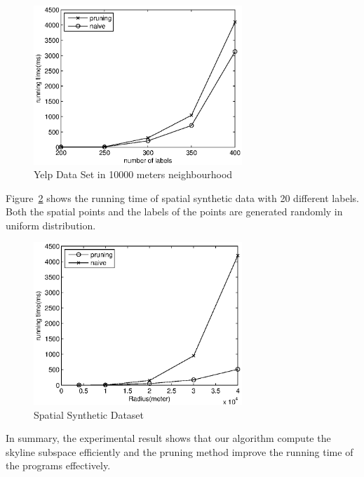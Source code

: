 \begin{figure}[h]
    \centering
      \includegraphics[width=0.7\textwidth]{figs/Yelp10Kmeters}
    \caption{\label{fig:exp:yelp10k}Yelp Data Set in 10000 meters neighbourhood}
\end{figure}

Figure~\ref{fig:exp:spatial} shows the running time of spatial synthetic data with 20 different labels. Both the spatial points and the labels of the points are generated randomly in uniform distribution.

\begin{figure}[h]
    \centering
        \includegraphics[width=0.7\textwidth]{figs/Spatial}
    \caption{\label{fig:exp:spatial}Spatial Synthetic Dataset}
\end{figure}

In summary, the experimental result shows that our algorithm compute the skyline subspace efficiently and the pruning method improve the running time of the programs effectively.